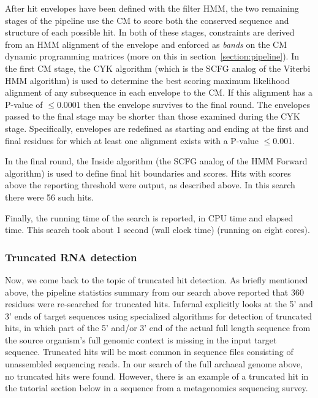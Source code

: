 After hit envelopes have been defined with the filter HMM, the two
remaining stages of the pipeline use the CM to score both the
conserved sequence and structure of each possible hit. In both of
these stages, constraints are derived from an HMM alignment of the
envelope and enforced as \emph{bands} on the CM dynamic programming
matrices (more on this in section~\ref{section:pipeline}). In the
first CM stage, the CYK algorithm (which is the SCFG analog of the
Viterbi HMM algorithm) is used to determine the best scoring maximum
likelihood alignment of any subsequence in each envelope to the CM. If
this alignment has a P-value of $\leq 0.0001$ then the envelope
survives to the final round. The envelopes passed to the final stage
may be shorter than those examined during the CYK stage. Specifically,
envelopes are redefined as starting and ending at the first and final
residues for which at least one alignment exists with a P-value $\leq
0.001$.

In the final round, the Inside algorithm (the SCFG analog of the HMM
Forward algorithm) is used to define final hit boundaries and
scores. Hits with scores above the reporting threshold were output, as
described above. In this search there were 56 such hits.

Finally, the running time of the search is reported, in CPU time and
elapsed time. This search took about 1 second (wall
clock time) (running on eight cores). 

\subsubsection{Truncated RNA detection}

Now, we come back to the topic of truncated hit detection.  As briefly
mentioned above, the pipeline statistics summary from our search above
reported that 360 residues were re-searched for truncated
hits. Infernal explicitly looks at the 5' and 3' ends of target
sequences using specialized algorithms for detection of truncated
hits, in which part of the 5' and/or 3' end of the actual full length
sequence from the source organism's full genomic context is missing in
the input target sequence. Truncated hits will be most common in
sequence files consisting of unassembled sequencing reads. In our
search of the full archaeal genome above, no truncated hits were
found. However, there is an example of a truncated hit in the
 tutorial section below in a sequence from a metagenomics
sequencing survey.

